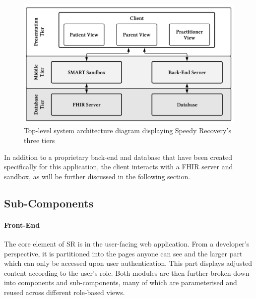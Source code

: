\documentclass[sigconf]{acmart}
\begin{document}
\begin{figure}
	\centering
	\includegraphics[width=\linewidth]{figures/system_architecture.png}
	\caption{Top-level system architecture diagram displaying Speedy Recovery's three tiers}
        \label{fig:system-architecture}
\end{figure}


In addition to a proprietary back-end and database that have been created specifically for this application, the client interacts with a FHIR server and sandbox, as will be further discussed in the following section.


\subsection{Sub-Components}


\paragraph{Front-End}
\label{sec:front-end}

The core element of SR is in the user-facing web application. From a developer's perspective, it is partitioned into the pages anyone can see and the larger part which can only be accessed upon user authentication. This part displays adjusted content according to the user's role. Both modules are then further broken down into components and sub-components, many of which are parameterised and reused across different role-based views.%
\end{document}
